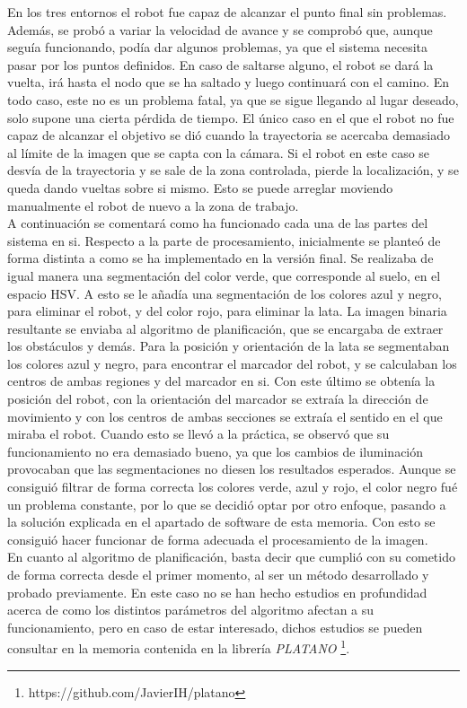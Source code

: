 En los tres entornos el robot fue capaz de alcanzar el punto final sin problemas. Además, se probó a variar la velocidad de avance y se comprobó que, aunque seguía funcionando, podía dar algunos problemas, ya que el sistema necesita pasar por los puntos definidos. En caso de saltarse alguno, el robot se dará la vuelta, irá hasta el nodo que se ha saltado y luego continuará con el camino. En todo caso, este no es un problema fatal, ya que se sigue llegando al lugar deseado, solo supone una cierta pérdida de tiempo. El único caso en el que el robot no fue capaz de alcanzar el objetivo se dió cuando la trayectoria se acercaba demasiado al límite de la imagen que se capta con la cámara. Si el robot en este caso se desvía de la trayectoria y se sale de la zona controlada, pierde la localización, y se queda dando vueltas sobre si mismo. Esto se puede arreglar moviendo manualmente el robot de nuevo a la zona de trabajo.\\

A continuación se comentará como ha funcionado cada una de las partes del sistema en si. Respecto a la parte de procesamiento, inicialmente se planteó de forma distinta a como se ha implementado en la versión final. Se realizaba de igual manera una segmentación del color verde, que corresponde al suelo, en el espacio HSV. A esto se le añadía una segmentación de los colores azul y negro, para eliminar el robot, y del color rojo, para eliminar la lata. La imagen binaria resultante se enviaba al algoritmo de planificación, que se encargaba de extraer los obstáculos y demás. Para la posición y orientación de la lata se segmentaban los colores azul y negro, para encontrar el marcador del robot, y se calculaban los centros de ambas regiones y del marcador en si. Con este último se obtenía la posición del robot, con la orientación del marcador se extraía la dirección de movimiento y con los centros de ambas secciones se extraía el sentido en el que miraba el robot. Cuando esto se llevó a la práctica, se observó que su funcionamiento no era demasiado bueno, ya que los cambios de iluminación provocaban que las segmentaciones no diesen los resultados esperados. Aunque se consiguió filtrar de forma correcta los colores verde, azul y rojo, el color negro fué un problema constante, por lo que se decidió optar por otro enfoque, pasando a la solución explicada en el apartado de software de esta memoria. Con esto se consiguió hacer funcionar de forma adecuada el procesamiento de la imagen.\\

En cuanto al algoritmo de planificación, basta decir que cumplió con su cometido de forma correcta desde el primer momento, al ser un método desarrollado y probado previamente. En este caso no se han hecho estudios en profundidad acerca de como los distintos parámetros del algoritmo afectan a su funcionamiento, pero en caso de estar interesado, dichos estudios se pueden consultar en la memoria contenida en la librería  \textit{PLATANO} \footnote{https://github.com/JavierIH/platano}.\\

